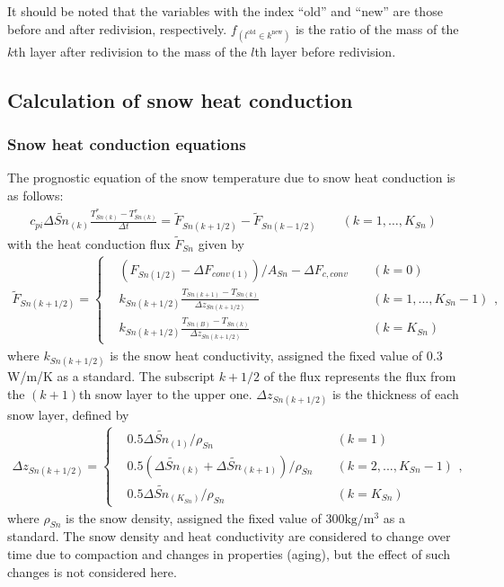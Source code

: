 It should be noted that the variables with the index ``old'' and ``new'' are those before and after redivision, respectively. \(f_{(l^{\mathrm{old}}\in k^{\mathrm{new}})}\) is the ratio of the mass of
the \(k\)th layer after redivision to the mass of the \(l\)th layer before redivision.

\subsection{Calculation of snow heat conduction}\label{calculation-of-snow-heat-conduction}

\subsubsection{Snow heat conduction equations}\label{snow-heat-conduction-equations}

The prognostic equation of the snow temperature due to snow heat conduction is as follows: \begin{eqnarray}
c_{pi} \Delta\widetilde{Sn}_{(k)} \frac{T_{Sn(k)}^{\ast} - T_{Sn(k)}^{\tau}}{\Delta t} = \widetilde{F}_{Sn(k+1/2)} - \widetilde{F}_{Sn(k-1/2)}
\qquad (k=1,\ldots,K_{Sn}) \label{8-29}
\end{eqnarray} with the heat conduction flux \(\widetilde{F}_{Sn}\) given by \begin{eqnarray}
\widetilde{F}_{Sn(k+1/2)}
 = \left\{
 \begin{aligned}
  & (F_{Sn(1/2)} - \Delta F_{conv(1)}) / A_{Sn} - \Delta F_{c,conv}
  \; &&(k = 0) \\
  & k_{Sn(k+1/2)} \frac{T_{Sn(k+1)}-T_{Sn(k)}}{\Delta z_{Sn(k+1/2)}}
  \; &&(k = 1, ..., K_{Sn}-1) \\
  & k_{Sn(k+1/2)} \frac{T_{Sn(B)}-T_{Sn(k)}}{\Delta z_{Sn(k+1/2)}}
  \; &&(k = K_{Sn})
 \end{aligned}
\right., \label{8-30}
\end{eqnarray} where \(k_{Sn(k+1/2)}\) is the snow heat conductivity, assigned the fixed value of 0.3 W/m/K as a standard. The subscript \(k+1/2\) of the flux represents the flux from the \((k+1)\)th snow layer
to the upper one. \(\Delta z_{Sn(k+1/2)}\) is the thickness of each snow layer, defined by \begin{eqnarray}
\Delta z_{Sn(k+1/2)}
 = \left\{
 \begin{aligned}
  & 0.5 \Delta\widetilde{Sn}_{(1)} / \rho_{Sn}
  \; &&(k = 1) \\
  & 0.5 (\Delta\widetilde{Sn}_{(k)} + \Delta\widetilde{Sn}_{(k+1)}) / \rho_{Sn}
  \; &&(k = 2, ..., K_{Sn}-1) \\
  & 0.5 \Delta\widetilde{Sn}_{(K_{Sn})} / \rho_{Sn}
  \; &&(k = K_{Sn})
 \end{aligned}
\right., \label{8-31}
\end{eqnarray} where \(\rho_{Sn}\) is the snow density, assigned the fixed value of \(300 \mathrm{kg/m^3}\) as a standard. The snow density and heat conductivity are considered to change over time due to
compaction and changes in properties (aging), but the effect of such changes is not considered here.


